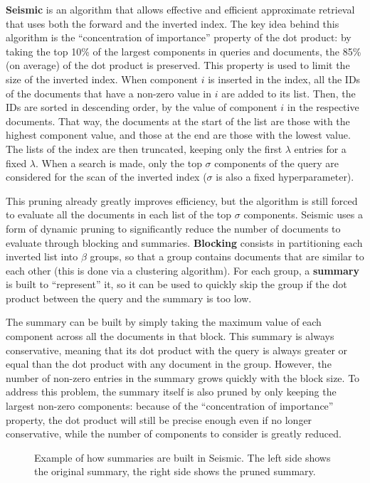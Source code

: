 \textbf{Seismic} is an algorithm that allows effective and efficient approximate retrieval that uses both the forward and the inverted index. The key idea behind this algorithm is the ``concentration of importance'' property of the dot product: by taking the top 10\% of the largest components in queries and documents, the 85\% (on average) of the dot product is preserved. This property is used to limit the size of the inverted index. When component $i$ is inserted in the index, all the IDs of the documents that have a non-zero value in $i$ are added to its list. Then, the IDs are sorted in descending order, by the value of component $i$ in the respective documents. That way, the documents at the start of the list are those with the highest component value, and those at the end are those with the lowest value. The lists of the index are then truncated, keeping only the first $\lambda$ entries for a fixed $\lambda$. When a search is made, only the top $\sigma$ components of the query are considered for the scan of the inverted index ($\sigma$ is also a fixed hyperparameter).

This pruning already greatly improves efficiency, but the algorithm is still forced to evaluate all the documents in each list of the top $\sigma$ components. Seismic uses a form of dynamic pruning to significantly reduce the number of documents to evaluate through blocking and summaries. \textbf{Blocking} consists in partitioning each inverted list into $\beta$ groups, so that a group contains documents that are similar to each other (this is done via a clustering algorithm). For each group, a \textbf{summary} is built to ``represent'' it, so it can be used to quickly skip the group if the dot product between the query and the summary is too low.

The summary can be built by simply taking the maximum value of each component across all the documents in that block. This summary is always conservative, meaning that its dot product with the query is always greater or equal than the dot product with any document in the group. However, the number of non-zero entries in the summary grows quickly with the block size. To address this problem, the summary itself is also pruned by only keeping the largest non-zero components: because of the ``concentration of importance'' property, the dot product will still be precise enough even if no longer conservative, while the number of components to consider is greatly reduced.
\begin{figure}[h]
    \vspace{10pt}
    \centering
    
    \caption{Example of how summaries are built in Seismic. The left side shows the original summary, the right side shows the pruned summary.}
\end{figure}